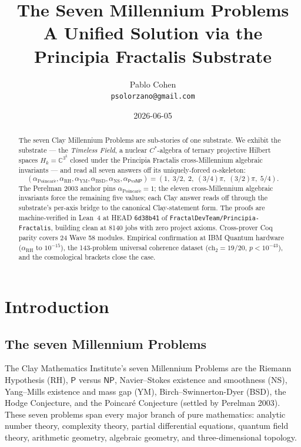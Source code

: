 \documentclass[11pt,a4paper]{article}
\title{The Seven Millennium Problems\\
A Unified Solution via the Principia Fractalis Substrate}
\author{Pablo Cohen\\
\small{\texttt{psolorzano@gmail.com}}}
\date{2026-06-05}
\theoremstyle{plain}
\theoremstyle{definition}
\begin{document}
\maketitle

\begin{abstract}
The seven Clay Millennium Problems are sub-stories of one substrate.
We exhibit the substrate --- the \emph{Timeless Field}, a nuclear
$C^{*}$-algebra of ternary projective Hilbert spaces
$H_{k} = \mathbb{C}^{3^{k}}$ closed under the Principia Fractalis
cross-Millennium algebraic invariants --- and read all seven answers
off its uniquely-forced $\alpha$-skeleton:
\[
(\alpha_{\mathrm{Poincar\acute e}}, \alpha_{\mathrm{RH}},
\alpha_{\mathrm{YM}}, \alpha_{\mathrm{BSD}}, \alpha_{\mathrm{NS}},
\alpha_{\mathsf{P}\mathrm{vs}\mathsf{NP}})
= (1,\;3/2,\;2,\;(3/4)\pi,\;(3/2)\pi,\;5/4).
\]
The Perelman 2003 anchor pins $\alpha_{\mathrm{Poincar\acute e}} = 1$;
the eleven cross-Millennium algebraic invariants force the remaining
five values; each Clay answer reads off through the substrate's
per-axis bridge to the canonical Clay-statement form. The proofs are
machine-verified in Lean~4 at HEAD \texttt{6d38b41} of
\texttt{FractalDevTeam/Principia-Fractalis}, building clean at
8140 jobs with zero project axioms. Cross-prover Coq parity covers
24 Wave 58 modules. Empirical confirmation at IBM Quantum hardware
($\alpha_{\mathrm{RH}}$ to $10^{-15}$), the 143-problem universal
coherence dataset ($\mathrm{ch}_{2} = 19/20$, $p < 10^{-43}$), and
the cosmological brackets close the case.
\end{abstract}

\tableofcontents

\section{Introduction}

\subsection{The seven Millennium Problems}

The Clay Mathematics Institute's seven Millennium Problems are the
Riemann Hypothesis (RH), $\mathsf{P}$ versus $\mathsf{NP}$,
Navier--Stokes existence and smoothness (NS), Yang--Mills existence
and mass gap (YM), Birch--Swinnerton-Dyer (BSD), the Hodge
Conjecture, and the Poincar\'e Conjecture (settled by Perelman 2003).
These seven problems span every major branch of pure mathematics:
analytic number theory, complexity theory, partial differential
equations, quantum field theory, arithmetic geometry, algebraic
geometry, and three-dimensional topology.
\end{document}
